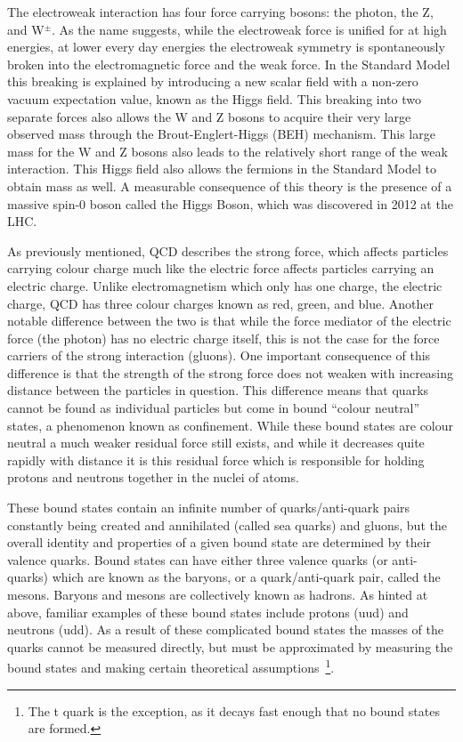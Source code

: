 The electroweak interaction has four force carrying bosons: the photon, the Z, and W$^{\pm}$.  
As the name suggests, while the electroweak force is unified for at high energies, at lower every day energies the electroweak symmetry is spontaneously broken into the electromagnetic force and the weak force.  
In the Standard Model this breaking is explained by introducing a new scalar field with a non-zero vacuum expectation value, known as the Higgs field.  
This breaking into two separate forces also allows the W and Z bosons to acquire their very large observed mass through the Brout-Englert-Higgs (BEH) mechanism.  
This large mass for the W and Z bosons also leads to the relatively short range of the weak interaction.  
This Higgs field also allows the fermions in the Standard Model to obtain mass as well.  
A measurable consequence of this theory is the presence of a massive spin-0 boson called the Higgs Boson, which was discovered in 2012 at the \gls{LHC}.  

As previously mentioned, \gls{QCD} describes the strong force, which affects particles carrying colour charge much like the electric force affects particles carrying an electric charge.  
Unlike electromagnetism which only has one charge, the electric charge, \gls{QCD} has three colour charges known as red, green, and blue.  
Another notable difference between the two is that while the force mediator of the electric force (the photon) has no electric charge itself, this is not the case for the force carriers of the strong interaction (gluons).  
One important consequence of this difference is that the strength of the strong force does not weaken with increasing distance between the particles in question.  
This difference means that quarks cannot be found as individual particles but come in bound ``colour neutral'' states, a phenomenon known as confinement.  
While these bound states are colour neutral a much weaker residual force still exists, and while it decreases quite rapidly with distance it is this residual force which is responsible for holding protons and neutrons together in the nuclei of atoms.  

These bound states contain an infinite number of quarks/anti-quark pairs constantly being created and annihilated (called sea quarks) and gluons, but the overall identity and properties of a given bound state are determined by their valence quarks.  
Bound states can have either three valence quarks (or anti-quarks) which are known as the baryons, or a quark/anti-quark pair, called the mesons.  
Baryons and mesons are collectively known as hadrons.  
As hinted at above, familiar examples of these bound states include protons (uud) and neutrons (udd).  
As a result of these complicated bound states the masses of the quarks cannot be measured directly, but must be approximated by measuring the bound states and making certain theoretical assumptions~\footnote{The t quark is the exception, as it decays fast enough that no bound states are formed.}.
 

